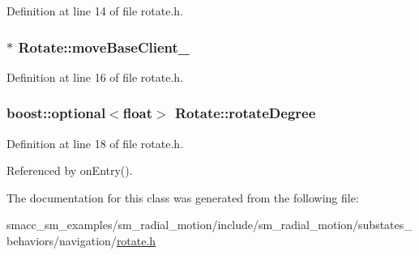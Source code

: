 Definition at line 14 of file rotate.\+h.

\subsubsection[{\texorpdfstring{move\+Base\+Client\+\_\+}{moveBaseClient_}}]{$\ast$ Rotate\+::move\+Base\+Client\+\_\+}\hypertarget{classRotate_ae632332fc9901b146697d5942d83ed42}{}\label{classRotate_ae632332fc9901b146697d5942d83ed42}


Definition at line 16 of file rotate.\+h.

\subsubsection[{\texorpdfstring{rotate\+Degree}{rotateDegree}}]{\setlength{\rightskip}{0pt plus 5cm}boost\+::optional$<$float$>$ Rotate\+::rotate\+Degree}\hypertarget{classRotate_a0d494e54d8311aafe97bd44b381c039c}{}\label{classRotate_a0d494e54d8311aafe97bd44b381c039c}


Definition at line 18 of file rotate.\+h.



Referenced by on\+Entry().



The documentation for this class was generated from the following file\+:\begin{DoxyCompactItemize}
\item 
smacc\+\_\+sm\+\_\+examples/sm\+\_\+radial\+\_\+motion/include/sm\+\_\+radial\+\_\+motion/substates\+\_\+behaviors/navigation/\hyperlink{rotate_8h}{rotate.\+h}\end{DoxyCompactItemize}
